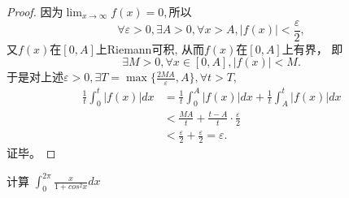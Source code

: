 \begin{proof} 
  因为$\lim_{x\rightarrow\infty}f(x)=0,$所以$$\forall\varepsilon>0,\exists A>0,\forall x>A,|f(x)|<\frac{\varepsilon}{2},$$
  又$f(x)$在$[0,A]$上Riemann可积, 从而$f(x)$在$[0,A]$上有界，
  即$$\exists M>0,\forall x\in[0,A],|f(x)|<M.$$
  于是对上述$\varepsilon>0,\exists T=\max\{\frac{2MA}{\varepsilon},A\},\forall t>T,$
  \begin{align*}
  \frac{1}{t}\int_0^t|f(x)|dx&=\frac1t\int_0^A|f(x)|dx+\frac1t\int_A^t|f(x)|dx\\
  &<\frac{MA}{t}+\frac{t-A}{t}\cdot\frac{\varepsilon}{2}\\
  &<\frac{\varepsilon}{2}+\frac{\varepsilon}{2}=\varepsilon.
  \end{align*}
  证毕。
\end{proof}

  
  \begin{example}
  计算 $\int_0^{2\pi}\frac x{1+cos^2x}dx$ %
  \end{example}

